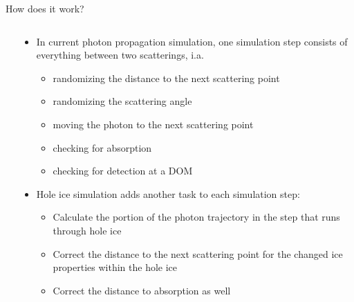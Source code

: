 
\begin{frame}[fragile]{How does it work?}

  \begin{columns}
    \begin{column}{0.5\textwidth}
    \end{column}
    \begin{column}{0.5\textwidth}

      \begin{itemize}
        \item<1> In current photon propagation simulation, one simulation step consists of everything between two scatterings, i.a.
          \begin{itemize}
            \item randomizing the distance to the next scattering point
            \item randomizing the scattering angle
            \item moving the photon to the next scattering point
            \item checking for absorption
            \item checking for detection at a DOM
          \end{itemize}

        \item<2> Hole ice simulation adds another task to each simulation step:
          \begin{itemize}
            \item Calculate the portion of the photon trajectory in the step that runs through hole ice
            \item Correct the distance to the next scattering point for the changed ice properties within the hole ice
            \item Correct the distance to absorption as well
          \end{itemize}
      \end{itemize}

    \end{column}
  \end{columns}

\end{frame}